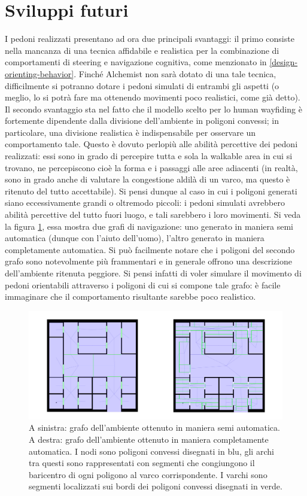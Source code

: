 \documentclass[12pt,a4paper,openright,oneside]{book}
\begin{document}
\section{Sviluppi futuri}
I pedoni realizzati presentano ad ora due principali svantaggi: il primo consiste nella mancanza di una tecnica affidabile e realistica per la combinazione di comportamenti di steering e navigazione cognitiva, come menzionato in \ref{design-orienting-behavior}. Finché Alchemist non sarà dotato di una tale tecnica, difficilmente si potranno dotare i pedoni simulati di entrambi gli aspetti (o meglio, lo si potrà fare ma ottenendo movimenti poco realistici, come già detto). Il secondo svantaggio sta nel fatto che il modello scelto per lo human wayfiding è fortemente dipendente dalla divisione dell'ambiente in poligoni convessi; in particolare, una divisione realistica è indispensabile per osservare un comportamento tale. Questo è dovuto perlopiù alle abilità percettive dei pedoni realizzati: essi sono in grado di percepire tutta e sola la walkable area in cui si trovano, ne percepiscono cioè la forma e i passaggi alle aree adiacenti (in realtà, sono in grado anche di valutare la congestione aldilà di un varco, ma questo è ritenuto del tutto accettabile). Si pensi dunque al caso in cui i poligoni generati siano eccessivamente grandi o oltremodo piccoli: i pedoni simulati avrebbero abilità percettive del tutto fuori luogo, e tali sarebbero i loro movimenti. Si veda la figura \cref{fig:envgraphs}, essa mostra due grafi di navigazione: uno generato in maniera semi automatica (dunque con l'aiuto dell'uomo), l'altro generato in maniera completamente automatica. Si può facilmente notare che i poligoni del secondo grafo sono notevolmente più frammentari e in generale offrono una descrizione dell'ambiente ritenuta peggiore. Si pensi infatti di voler simulare il movimento di pedoni orientabili attraverso i poligoni di cui si compone tale grafo: è facile immaginare che il comportamento risultante sarebbe poco realistico.
\begin{figure}
	\centering
	\includegraphics[width=\linewidth]{figures/envgraph.png}
	\caption{A sinistra: grafo dell'ambiente ottenuto in maniera semi automatica. A destra: grafo dell'ambiente ottenuto in maniera completamente automatica. I nodi sono poligoni convessi disegnati in blu, gli archi tra questi sono rappresentati con segmenti che congiungono il baricentro di ogni poligono al varco corrispondente. I varchi sono segmenti localizzati sui bordi dei poligoni convessi disegnati in verde.}
	\label{fig:envgraphs}
\end{figure}
\end{document}
